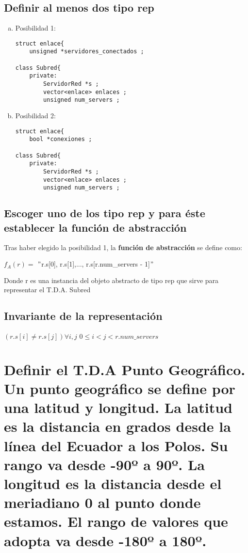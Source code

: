 \subsection{Definir al menos dos tipo rep}
\begin{enumerate}[a)]
\item Posibilidad 1:
\begin{lstlisting}[style=cmas]
struct enlace{
	unsigned *servidores_conectados ; 

class Subred{
	private:
		ServidorRed *s ;
		vector<enlace> enlaces ;
		unsigned num_servers ;			
\end{lstlisting}
\setlength{\parskip}{-4mm}
\item Posibilidad 2:
\begin{lstlisting}[style=cmas]
struct enlace{
	bool *conexiones ;
	
class Subred{
	private:
		ServidorRed *s ;
		vector<enlace> enlaces ;
		unsigned num_servers ;		
\end{lstlisting}
\end{enumerate}

\subsection{Escoger uno de los tipo rep y para éste establecer la función de abstracción}
Tras haber elegido la posibilidad 1, la \textbf{función de abstracción} se define como:\\
\begin{center}
	$ f_{A}(r) = $ $ " $r.s[0], r.s[1],..., r.s[r.num\_servers - 1]$ " $
\end{center}
Donde r es una instancia del objeto abstracto de tipo rep que sirve para representar el T.D.A. Subred

\subsection{Invariante de la representación}
\begin{center}
	$ (r.s[i] \neq r.s[j])\forall i,j $ $0 \leq i < j < r.num\_servers $
\end{center}

\newpage

\section{Definir el T.D.A Punto Geográfico. Un punto geográfico se define por una latitud y longitud.
	La latitud es la distancia en grados desde la línea del Ecuador a los Polos. Su rango va
	desde -90º a 90º. La longitud es la distancia desde el meriadiano 0 al punto donde estamos.
	El rango de valores que adopta va desde -180º a 180º.}
